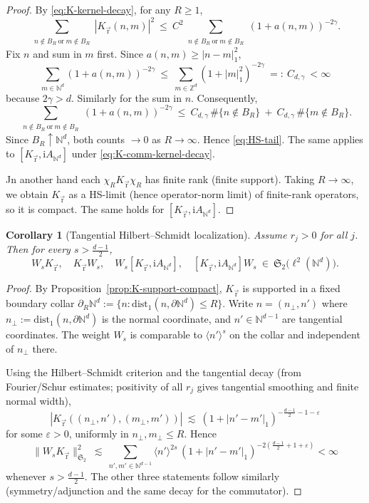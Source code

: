 \documentclass[10pt]{amsart}
\newcommand{\Z}{{\mathbb{Z}}}
\newcommand{\N}{{\mathbb{N}}}
\newcommand{\1}{{\mathbb{I}}}
\numberwithin{equation}{section}
\newtheorem{corollary}[theorem]{Corollary}%
\begin{document}
\begin{proof}

By \eqref{eq:K-kernel-decay}, for any $R\ge1$,
\[
\sum_{\substack{n\notin B_R\ \text{or}\ m\notin B_R}} |K_{\vec{\mathrm{r}}}(n,m)|^2
\ \le\ C^2 \sum_{\substack{n\notin B_R\ \text{or}\ m\notin B_R}} (1+a(n,m))^{-2\gamma}.
\]
Fix $n$ and sum in $m$ first. Since $a(n,m)\ge |n-m|_1^2$,
\[
\sum_{m\in\N^d} (1+a(n,m))^{-2\gamma}
\ \le\ \sum_{m\in\Z^d} (1+|m|_1^2)^{-2\gamma}
\ =:\ C_{d,\gamma}\ <\infty
\]
because $2\gamma > d$. Similarly for the sum in $n$. Consequently,
\[
\sum_{\substack{n\notin B_R\ \text{or}\ m\notin B_R}} (1+a(n,m))^{-2\gamma}
\ \le\ C_{d,\gamma}\,\#\{n\notin B_R\}\ +\ C_{d,\gamma}\,\#\{m\notin B_R\}.
\]
Since $B_R\uparrow\N^d$, both counts $\to0$ as $R\to\infty$. Hence \eqref{eq:HS-tail}. The same applies to $[K_{\vec{\mathrm{r}}},\mathrm i A_{\N^d}]$ under \eqref{eq:K-comm-kernel-decay}.

 Jn another hand each $\chi_R K_{\vec{\mathrm{r}}}\chi_R$ has finite rank (finite support). Taking $R\to\infty$, we obtain $K_{\vec{\mathrm{r}}}$ as a HS-limit (hence operator-norm limit) of finite-rank operators, so it is compact. The same holds for $[K_{\vec{\mathrm{r}}},\mathrm i A_{\N^d}]$.
\end{proof}

\begin{corollary}[Tangential Hilbert--Schmidt localization]\label{cor:HS-tangential}
Assume $r_j>0$ for all $j$. Then for every $s>\frac{d-1}{2}$,
\[
W_s K_{\vec{\mathrm{r}}},\quad K_{\vec{\mathrm{r}}} W_s,\quad
W_s [K_{\vec{\mathrm{r}}},\mathrm i A_{\N^d}],\quad [K_{\vec{\mathrm{r}}},\mathrm i A_{\N^d}] W_s
\ \in\ \mathfrak S_2\big(\ell^2(\N^d)\big).
\]
\end{corollary}

\begin{proof}
By Proposition~\ref{prop:K-support-compact}, $K_{\vec{\mathrm{r}}}$ is supported in a fixed boundary collar
$\partial_R\N^d:=\{n:\mathrm{dist}_1(n,\partial\N^d)\le R\}$.
Write $n=(n_\perp,n')$ where $n_\perp:=\mathrm{dist}_1(n,\partial\N^d)$ is the normal coordinate, and $n'\in\N^{d-1}$ are tangential coordinates. The weight $W_s$ is comparable to $\langle n'\rangle^{s}$ on the collar and independent of $n_\perp$ there.

Using the Hilbert--Schmidt criterion and the tangential decay (from Fourier/Schur estimates; positivity of all $r_j$ gives tangential smoothing and finite normal width),
\[
|K_{\vec{\mathrm{r}}}((n_\perp,n'),(m_\perp,m'))|
\ \lesssim\ (1+|n'-m'|_1)^{-\frac{d-1}{2}-1-\varepsilon}
\]
for some $\varepsilon>0$, uniformly in $n_\perp,m_\perp\le R$. Hence
\[
\|W_s K_{\vec{\mathrm{r}}}\|_{\mathfrak S_2}^2
\ \lesssim\ \sum_{n',m'\in\N^{d-1}} \langle n'\rangle^{2s}\,(1+|n'-m'|_1)^{-2(\frac{d-1}{2}+1+\varepsilon)}<\infty
\]
whenever $s>\frac{d-1}{2}$. The other three statements follow similarly (symmetry/adjunction and the same decay for the commutator).
\end{proof}
\end{document}

